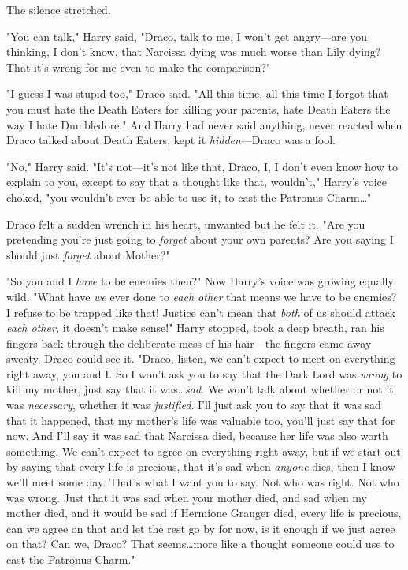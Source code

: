 The silence stretched.

"You can talk," Harry said, "Draco, talk to me, I won’t get angry—are you
thinking, I don’t know, that Narcissa dying was much worse than Lily dying?
That it’s wrong for me even to make the comparison?"

"I guess I was stupid too," Draco said. "All this time, all this time I forgot
that you must hate the Death Eaters for killing your parents, hate Death Eaters
the way I hate Dumbledore." And Harry had never said anything, never reacted
when Draco talked about Death Eaters, kept it \emph{hidden}—Draco was a fool.

"No," Harry said. "It’s not—it’s not like that, Draco, I, I don’t even know
how to explain to you, except to say that a thought like that, wouldn’t,"
Harry’s voice choked, "you wouldn’t ever be able to use it, to cast the
Patronus Charm…"

Draco felt a sudden wrench in his heart, unwanted but he felt it. "Are you
pretending you’re just going to \emph{forget} about your own parents? Are you
saying I should just \emph{forget} about Mother?"

"So you and I \emph{have} to be enemies then?" Now Harry’s voice was growing
equally wild. "What have \emph{we} ever done to \emph{each other} that means we
have to be enemies? I refuse to be trapped like that! Justice can’t mean that
\emph{both} of us should attack \emph{each other,} it doesn’t make sense!"
Harry stopped, took a deep breath, ran his fingers back through the deliberate
mess of his hair—the fingers came away sweaty, Draco could see it. "Draco,
listen, we can’t expect to meet on everything right away, you and I\@. So I won’t
ask you to say that the Dark Lord was \emph{wrong} to kill my mother, just say
that it was…\emph{sad}. We won’t talk about whether or not it was
\emph{necessary}, whether it was \emph{justified}. I’ll just ask you to say
that it was sad that it happened, that my mother’s life was valuable too,
you’ll just say that for now. And I’ll say it was sad that Narcissa died,
because her life was also worth something. We can’t expect to agree on
everything right away, but if we start out by saying that every life is
precious, that it’s sad when \emph{anyone} dies, then I know we’ll meet
some day. That’s what I want you to say. Not who was right. Not who was wrong.
Just that it was sad when your mother died, and sad when my mother died, and it
would be sad if Hermione Granger died, every life is precious, can we agree on
that and let the rest go by for now, is it enough if we just agree on that? Can
we, Draco? That seems…more like a thought someone could use to cast the
Patronus Charm."

